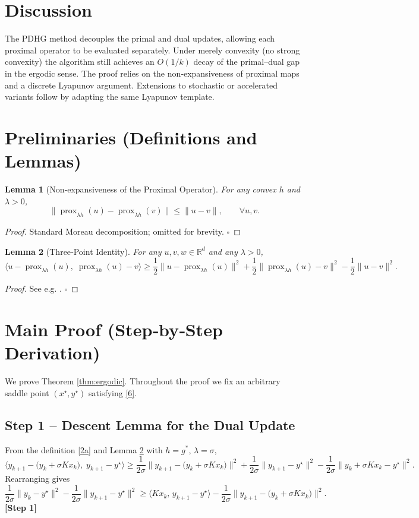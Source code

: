 \documentclass[11pt]{article}
\newtheorem{lemma}{Lemma}[section]
\begin{document}
\section*{Discussion}
The PDHG method decouples the primal and dual updates, allowing each proximal operator to be evaluated separately. Under merely convexity (no strong convexity) the algorithm still achieves an $O(1/k)$ decay of the primal–dual gap in the ergodic sense. The proof relies on the non‑expansiveness of proximal maps and a discrete Lyapunov argument. Extensions to stochastic or accelerated variants follow by adapting the same Lyapunov template.

\newpage
\section*{Preliminaries (Definitions and Lemmas)}
\begin{lemma}[Non‑expansiveness of the Proximal Operator]\label{lem:prox}
For any convex $h$ and $\lambda>0$,
\[
\|\operatorname{prox}_{\lambda h}(u)-\operatorname{prox}_{\lambda h}(v)\|\le\|u-v\|,\qquad\forall u,v.
\tag{9}
\]
\end{lemma}
\begin{proof}
Standard Moreau decomposition; omitted for brevity. \hfill $\square$
\end{proof}

\begin{lemma}[Three‑Point Identity]\label{lem:three}
For any $u,v,w\in\mathbb{R}^{d}$ and any $\lambda>0$,
\[
\langle u-\operatorname{prox}_{\lambda h}(u),\; \operatorname{prox}_{\lambda h}(u)-v\rangle
\ge \frac{1}{2}\bigl\|u-\operatorname{prox}_{\lambda h}(u)\bigr\|^{2}
    +\frac{1}{2}\bigl\|\operatorname{prox}_{\lambda h}(u)-v\bigr\|^{2}
    -\frac{1}{2}\|u-v\|^{2}.
\tag{10}
\]
\end{lemma}
\begin{proof}
See e.g. \cite{Bauschke2011}. \hfill $\square$
\end{proof}

\section*{Main Proof (Step‑by‑Step Derivation)}
We prove Theorem \ref{thm:ergodic}. Throughout the proof we fix an arbitrary saddle point $(x^{\star},y^{\star})$ satisfying \eqref{6}.

\subsection*{Step 1 – Descent Lemma for the Dual Update}
From the definition \eqref{2a} and Lemma \ref{lem:three} with $h=g^{*}$, $\lambda=\sigma$,
\[
\langle y_{k+1}-\bigl(y_{k}+\sigma Kx_{k}\bigr),\; y_{k+1}-y^{\star}\rangle
\ge\frac{1}{2\sigma}\|y_{k+1}-\bigl(y_{k}+\sigma Kx_{k}\bigr)\|^{2}
     +\frac{1}{2\sigma}\|y_{k+1}-y^{\star}\|^{2}
     -\frac{1}{2\sigma}\|y_{k}+\sigma Kx_{k}-y^{\star}\|^{2}.
\tag{11}
\]
Rearranging gives
\[
\frac{1}{2\sigma}\|y_{k}-y^{\star}\|^{2}
-\frac{1}{2\sigma}\|y_{k+1}-y^{\star}\|^{2}
\ge \langle Kx_{k},\, y_{k+1}-y^{\star}\rangle
     -\frac{1}{2\sigma}\|y_{k+1}-\bigl(y_{k}+\sigma Kx_{k}\bigr)\|^{2}.
\tag{12}
\]
\textbf{[Step 1]}
\end{document}
